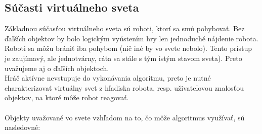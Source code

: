 \subsection{Súčasti virtuálneho sveta} %
\label{staticky svet}
Základnou súčasťou virtuálneho sveta sú roboti, ktorí sa smú pohybovať. Bez ďaľších objektov by bolo logickým vyústením hry len jednoduché nájdenie robota.
Roboti sa môžu brániť iba pohybom (nič iné by vo svete nebolo). Tento prístup je zaujímavý, ale jednotvárny, ráta sa stále s tým istým stavom sveta). Preto uvažujeme aj o ďaľších objektoch. \\%
\indent Hráč aktívne nevstupuje do vykonávania algoritmu, preto je nutné charakterizovať virtuálny svet z hľadiska robota, resp. uživateľovou znalosťou objektov, na ktoré môže robot reagovať.\\
\\
\indent Objekty uvažované vo svete vzhľadom na to, čo môže algoritmus využívať, sú nasledovné:
